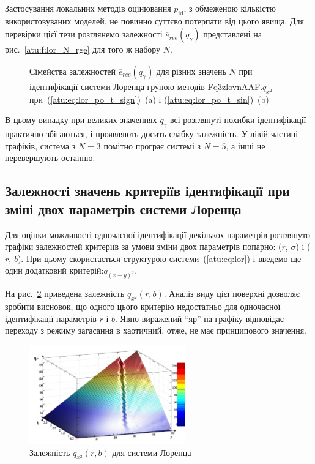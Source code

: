 Застосування локальних методів оцінювання
$p_\mathrm{id} $, з обмеженою кількістю використовуваних моделей,
не повинно суттєво потерпати від цього явища. Для перевірки цієї тези
розглянемо залежності
$\overline{e}_{ree} (q_\gamma) $ представлені на рис.~\ref{atu:f:lor_N_rge} для того
ж набору $ N $.

\begin{figure}[htb!]
  \caption{Сімейства залежностей $ \overline{e}_{ree} (q_\gamma) $ для різних значень
    $ N $ при ідентифікації системи Лоренца групою методів Fq3zlovnAAF.$q_{x^2} $ при~(\ref{atu:eq:lor_po_t_sign})~(a) і (\ref{atu:eq:lor_po_t_sin})~(b)}
\label{atu:f:lor_N_ree}
\end{figure}

В цьому випадку при великих значеннях
$q_\gamma $ всі розглянуті похибки ідентифікації практично
збігаються, і проявляють досить слабку залежність. У лівій
частині графіків, система з
$N=3$ помітно програє системі з
$N=5$, а інші не перевершують останню.




\subsection{Залежності значень критеріїв ідентифікації при зміні двох параметрів системи Лоренца} %

Для оцінки можливості одночасної ідентифікації декількох параметрів
розглянуто графіки залежностей критеріїв за умови зміни двох параметрів
попарно: ($r$, $\sigma$) і ($r$, $b$).
%
При цьому скористається структурою системи~(\ref{atu:eq:lor}) і введемо
ще один додатковий критерій:$ q_{(x-y)^2} $.

На рис.~\ref{atu:f:lor_qx2_r_b} приведена залежність
$q_{x^2} (r, b) $. Аналіз виду цієї поверхні дозволяє зробити
висновок, що одного цього критерію недостатньо для одночасної
ідентифікації параметрів
$r $ і
$b $. Явно виражений ``яр'' на графіку відповідає переходу з режиму
загасання в хаотичний, отже, не має принципового значення.

\begin{figure}[htb!]
  \begin{center}
    \includegraphics[width=0.60\textwidth]{p/cha/lor/q2d/lor_qx2_r_b.png}
  \end{center}
  \caption{Залежність $ q_{x^2} (r, b) $ для системи Лоренца}
  \label{atu:f:lor_qx2_r_b}
\end{figure}


